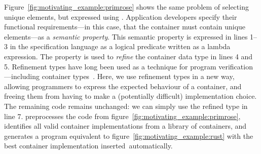 Figure~\ref{fig:motivating_example:primrose} shows the same problem of selecting unique elements, but expressed using \Primrose{}.
Application developers specify their functional requirements---in this case, that the container must contain unique elements---as a \emph{semantic property}.
This semantic property is expressed in lines 1--3 in the \Primrose{} specification language as a logical predicate written as a lambda expression.
The property is used to \emph{refine} the container data type in lines 4 and 5.
Refinement types have long been used as a technique for program verification---including container types~\citep{DBLP:conf/esop/VazouRJ13}.
Here, we use refinement types in a new way, allowing programmers to express the expected behaviour of a container, and freeing them from having to make a (potentially difficult) implementation choice.
The remaining code remains unchanged: we can simply use the refined type in line 7.
\Primrose{} preprocesses the code from figure~\ref{fig:motivating_example:primrose}, identifies all valid container implementations from a library of containers, and generates a program equivalent to figure~\ref{fig:motivating_example:rust} with the best container implementation inserted~automatically.

